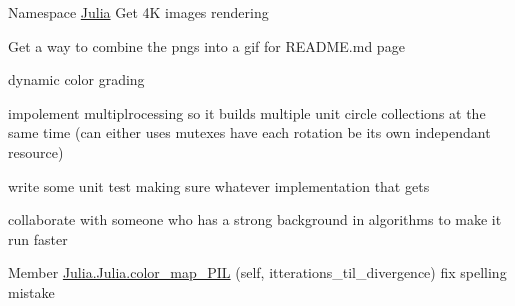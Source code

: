 
\begin{DoxyRefList}
\item[Namespace \mbox{\hyperlink{namespaceJulia}{Julia}} ]\label{todo__todo000001}%
%
Get 4K images rendering 

Get a way to combine the pngs into a gif for README.\+md page 

dynamic color grading 

impolement multiplrocessing so it builds multiple unit circle collections at the same time (can either uses mutexes have each rotation be its own independant resource) 

write some unit test making sure whatever implementation that gets 

collaborate with someone who has a strong background in algorithms to make it run faster  
\item[Member \mbox{\hyperlink{classJulia_1_1Julia_a966f5090e8ab789ab45b8bbe84435da9}{Julia.Julia.color\+\_\+map\+\_\+\+PIL}} (self, itterations\+\_\+til\+\_\+divergence)]\label{todo__todo000002}%
%
fix spelling mistake 
\end{DoxyRefList}